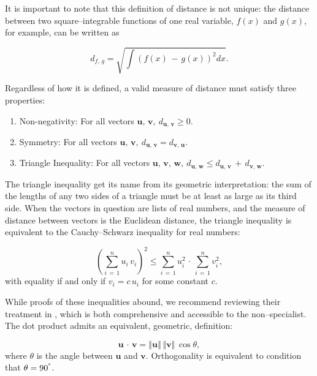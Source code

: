 \documentclass[graybox,envcountchap,sectrefs]{svmono}\usepackage[]{graphicx}\usepackage[]{xcolor}
\makeatletter
\newcommand{\lyxmathsym}[1]{\ifmmode\begingroup\def\b@ld{bold}
  \text{\ifx\math@version\b@ld\bfseries\fi#1}\endgroup\else#1\fi}
\makeatother
\begin{document}
\begin{appendices}
It is important to note that this definition of distance is not unique:
the distance between two square--integrable functions of one real
variable, $f(x)$ and $g(x)$, for example, can be written as

\begin{equation}
d_{f,\,g}=\sqrt{\int\left(f(x)\,-\,g(x)\right)^{2}dx}.\label{eq:DistanceBetweenTwoFunctions}
\end{equation}

Regardless of how it is defined, a valid measure of distance must
satisfy three properties:
\begin{enumerate}
\item Non-negativity: For all vectors $\mathrm{\mathbf{u}},\,\mathrm{\mathbf{v}},\ d_{\mathrm{\mathbf{u}},\mathrm{\,\mathbf{v}}}\geqslant0.$
\item Symmetry: For all vectors $\mathrm{\mathbf{u}},\,\mathrm{\mathbf{v}},\ d_{\mathrm{\mathbf{u}},\,\mathrm{\mathbf{v}}}=d_{\mathrm{\mathbf{v}},\,\mathrm{\mathbf{u}}}$.
\item Triangle Inequality: For all vectors $\mathrm{\mathbf{u}},\,\mathrm{\mathbf{v}},\,\mathrm{\mathbf{w}},\ d_{\mathrm{\mathbf{u}},\,\mathrm{\mathbf{w}}}\leqslant d_{\mathrm{\mathbf{u}},\,\mathrm{\mathbf{v}}}\,+\,d_{\mathrm{\mathbf{v}},\,\mathrm{\mathbf{w}}}.$ 
\end{enumerate}
The triangle inequality get its name from its geometric interpretation:
the sum of the lengths of any two sides of a triangle must be at least
as large as its third side. When the vectors in question are lists
of real numbers, and the measure of distance between vectors is the
Euclidean distance, the triangle inequality is equivalent to the Cauchy--Schwarz
inequality for real numbers:

\begin{equation}
\left(\sum_{i\,=\,1}^{n}u_{i}\,v_{i}\right)^{2}\leqslant\sum_{i\,=\,1}^{n}u_{i}^{2}\,\cdotp\,\sum_{i\,=\,1}^{n}v_{i}^{2},\label{eq:CauchySchwarz}
\end{equation}
with equality if and only if $v_{i}=c\,u_{i}$ for some constant $c$.

While proofs of these inequalities abound, we recommend reviewing
their treatment in \citet{Steele2004}, which is both comprehensive
and accessible to the non--specialist.  The dot product admits an
equivalent, geometric, definition:

\begin{equation}
\mathrm{\mathbf{u}}\,\cdotp\,\mathrm{\mathbf{v}}=\left\Vert \mathrm{\mathbf{u}}\right\Vert \,\left\Vert \mathrm{\mathbf{v}}\right\Vert \,\cos\theta,\label{eq:DotProduct2}
\end{equation}
where $\theta$ is the angle between $\mathrm{\mathbf{u}}$ and $\mathrm{\mathbf{v}}$.
Orthogonality is equivalent to condition that $\theta=90^{\lyxmathsym{\textdegree}}$.


\end{appendices}
\end{document}
